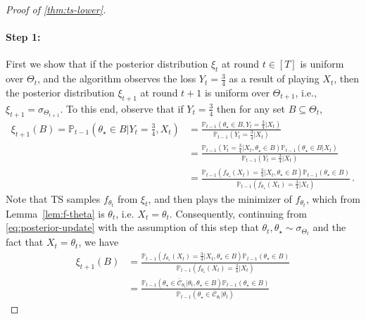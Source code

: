 \documentclass[letter, 12pt]{report}
\newcommand{\paren}[1]{\left( #1 \right)}
\newcommand{\cC}{\mathcal C}
\newcommand{\1}{\mathbf{1}}
\newcommand{\mP}{\mathbb{P}}
\newcommand{\ts}{\textsc{TS}\xspace}
\theoremstyle{plain}
\theoremstyle{definition}
\theoremstyle{remark}
\begin{document}
\begin{proof}[Proof of \cref{thm:ts-lower}]
    \paragraph{Step 1:}
    First we show that if the posterior distribution $\xi_t$ at round $t \in [T]$ is
    uniform over $\Theta_t$, and the algorithm observes the loss
    $Y_t = \frac34$ as a result of playing $X_t$,
    then the posterior distribution $\xi_{t+1}$ at round $t+1$ is uniform over $\Theta_{t+1}$,
    i.e., $\xi_{t+1} = \sigma_{\Theta_{t+1}}$.
    To this end, observe that
    if $Y_t = \frac34$ then
    for any set $B \subseteq \Theta_t$,
    \begin{align}
        \xi_{t+1}(B)
        =
        \mP_{t-1}\paren{
            \theta_\star \in B
            |
            Y_t = \frac34
            ,
            X_t
        }
         & =
        \frac{
            \mP_{t-1}(\theta_\star \in B, Y_t = \frac34| X_t)
        }{
            \mP_{t-1}(Y_t = \frac34| X_t)
        }
        \nonumber
        \\
         & =
        \frac{
            \mP_{t-1}(Y_t = \frac34| X_t, \theta_\star \in B)
            \mP_{t-1}(\theta_\star \in B| X_t)
        }{
            \mP_{t-1}(Y_t = \frac34| X_t)
        }
        \nonumber
        \\
         & =
        \frac{
        \mP_{t-1}(f_{\theta_\star}(X_t) = \frac34| X_t, \theta_\star \in B)
        \mP_{t-1}(\theta_\star \in B)
        }{
        \mP_{t-1}(f_{\theta_\star}(X_t) = \frac34| X_t)
        }\,.
        \label{eq:posterior-update}
    \end{align}
    Note that \ts{} samples $f_{\theta_t}$ from $\xi_t$,
    and then plays the minimizer of $f_{\theta_t}$,
    which from Lemma~\ref{lem:f-theta} is $\theta_{t}$, i.e. $X_{t} = \theta_{t}$.
    Consequently,
    continuing from \cref{eq:posterior-update}
    with the assumption of this step
    that $\theta_t, \theta_\star \sim \sigma_{\Theta_t}$
    and the fact that $X_t = \theta_t$,
    we have
    \begin{align*}
        \xi_{t+1}(B)
         & =
        \frac{
        \mP_{t-1}(f_{\theta_\star}(X_t) = \frac34| X_t, \theta_\star \in B)
        \mP_{t-1}(\theta_\star \in B)
        }{
        \mP_{t-1}(f_{\theta_\star}(X_t) = \frac34| X_t)
        }
        \\
         & =
        \frac{
            \mP_{t-1}(\theta_\star \in \bar{\cC}_{\theta_t}| \theta_t, \theta_\star \in B)
            \mP_{t-1}(\theta_\star \in B)
        }{
            \mP_{t-1}(\theta_\star \in \bar{\cC}_{\theta_t}| \theta_t)
}
\end{align*}
\end{proof}
\end{document}

